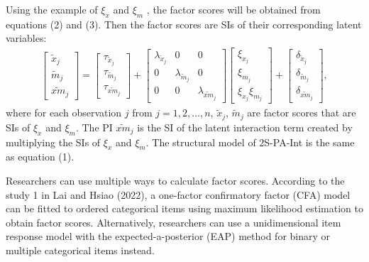 \documentclass[
  man]{apa7}
\begin{document}
Using the example of \(\xi_{x}\) and \(\xi_{m}\) , the factor scores will be obtained from equations (2) and (3). Then the factor scores are SIs of their corresponding latent variables:
\begin{align}
    \begin{bmatrix}
        \tilde{x}_{j} \\ 
        \tilde{m}_{j} \\
        \widetilde{xm}_{j} 
    \end{bmatrix} = 
    \begin{bmatrix}
        \tau_{\tilde{x}_{j}} \\
        \tau_{\tilde{m}_{j}} \\ 
        \tau_{\widetilde{xm}_{j}}
    \end{bmatrix} + 
    \begin{bmatrix}
        \lambda_{\tilde{x}_{j}} & 0 & 0 \\
        0 & \lambda_{\tilde{m}_{j}} & 0 \\ 
        0 & 0 & \lambda_{\widetilde{xm}_{j}} 
    \end{bmatrix} 
    \begin{bmatrix}
        \xi_{x_{j}} \\  
        \xi_{m_{j}} \\
        \xi_{x_{j}}\xi_{m_{j}}
    \end{bmatrix} +
    \begin{bmatrix}
        \delta_{\tilde{x}_{j}} \\
        \delta_{\tilde{m}_{j}} \\ 
        \delta_{\widetilde{xm}_{j}}
    \end{bmatrix},
\end{align}
where for each observation \(j\) from \(j = 1, 2, ..., n\), \(\tilde{x}_{j}\), \(\tilde{m}_{j}\) are factor scores that are SIs of \(\xi_{x}\) and \(\xi_{m}\). The PI \(\widetilde{xm}_{j}\) is the SI of the latent interaction term created by multiplying the SIs of \(\xi_{x}\) and \(\xi_{m}\). The structural model of 2S-PA-Int is the same as equation (1).

Researchers can use multiple ways to calculate factor scores. According to the study 1 in Lai and Hsiao (2022), a one-factor confirmatory factor (CFA) model can be fitted to ordered categorical items using maximum likelihood estimation to obtain factor scores. Alternatively, researchers can use a unidimensional item response model with the expected-a-posterior (EAP) method for binary or multiple categorical items instead.
\end{document}
